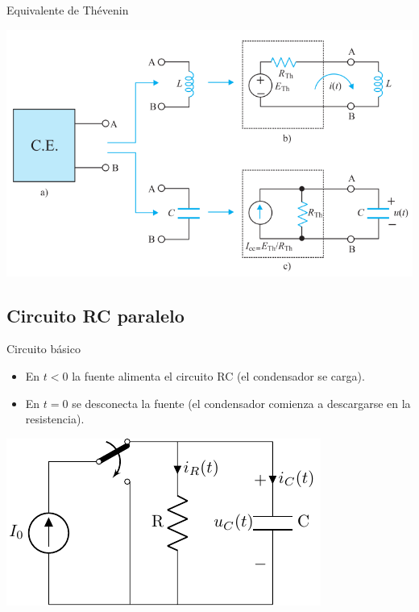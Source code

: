 \documentclass[xcolor={usenames,svgnames,dvipsnames}]{beamer}
\begin{document}
\begin{frame}[label={sec:orgf35fb15}]{Equivalente de Thévenin}
\begin{center}
\includegraphics[width=.9\linewidth]{figs/Thevenin_PrimerOrden.pdf}
\end{center}
\end{frame}
\subsection{Circuito RC paralelo}
\label{sec:org5b7da04}

\begin{frame}[label={sec:org4c2211d}]{Circuito básico}
\begin{itemize}
\item En \(t <0\) la fuente alimenta el circuito RC (el condensador se carga).
\item En \(t = 0\) se desconecta la fuente (el condensador comienza a descargarse en la resistencia).
\end{itemize}
\begin{center}
\includegraphics[width=.9\linewidth]{figs/transitorio_circuitoRC.pdf}
\end{center}
\end{frame}
\end{document}

